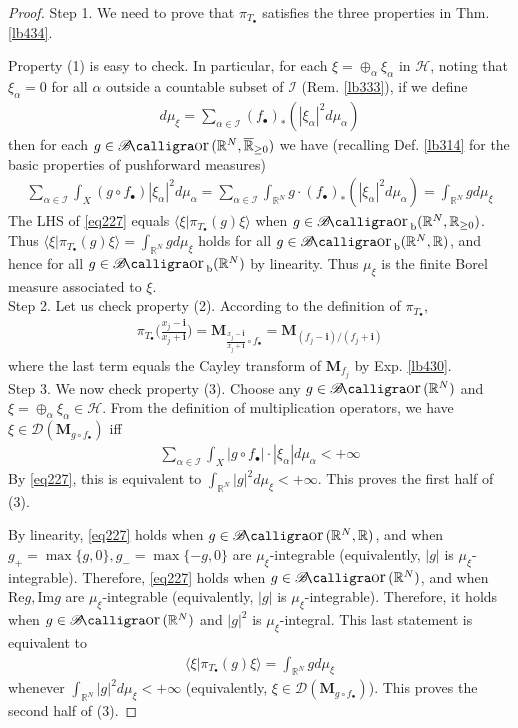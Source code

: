 \documentclass[12pt,b5paper,notitlepage]{article}
\theoremstyle{definition}
\theoremstyle{plain}
\DeclareMathOperator{\Bor}{\mathscr{B}\text{\kern -2pt {\calligra\large or}}\,}
\DeclareMathOperator{\Borb}{{\mathscr{B}\text{\kern -2pt {\calligra\large or}}\,}_{\mathrm b}}
\newcommand{\ovl}{\overline}
\newcommand{\Dom}{\mathscr{D}}
\newcommand{\bk}[1]{\langle {#1}\rangle}
\newcommand{\im}{\mathbf{i}}
\newcommand{\blt}{\bullet}
\newcommand{\Rbb}{\mathbb R}
\newcommand{\Real}{\mathrm{Re}}
\newcommand{\Imag}{\mathrm{Im}}
\newcommand{\MH}{\mathcal H}
\newcommand{\SI}{\mathscr I}
\newcommand{\Mbf}{\mathbf M}
\numberwithin{equation}{section}
\begin{document}
\begin{proof}
Step 1. We need to prove that $\pi_{T_\blt}$ satisfies the three properties in Thm. \ref{lb434}.

Property (1) is easy to check. In particular, for each $\xi=\oplus_\alpha\xi_\alpha$ in $\MH$, noting that $\xi_\alpha=0$ for all $\alpha$ outside a countable subset of $\SI$ (Rem. \ref{lb333}), if we define
\begin{align}
d\mu_\xi=\sum_{\alpha\in\SI}(f_\blt)_*(|\xi_\alpha|^2d\mu_\alpha)
\end{align}
then for each $g\in\Bor(\Rbb^N,\ovl{\Rbb}_{\geq0})$ we have (recalling Def. \ref{lb314} for the basic properties of pushforward measures)
\begin{align}\label{eq227}
\sum_{\alpha\in\SI}\int_X(g\circ f_\blt)|\xi_\alpha|^2d\mu_\alpha=\sum_{\alpha\in\SI}\int_{\Rbb^N}g\cdot (f_\blt)_*(|\xi_\alpha|^2d\mu_\alpha)=\int_{\Rbb^N}gd\mu_\xi
\end{align}
The LHS of \eqref{eq227} equals $\bk{\xi|\pi_{T_\blt}(g)\xi}$ when $g\in\Borb(\Rbb^N,\Rbb_{\geq0})$. Thus $\bk{\xi|\pi_{T_\blt}(g)\xi}=\int_{\Rbb^N}gd\mu_\xi$ holds for all $g\in\Borb(\Rbb^N,\Rbb)$, and hence for all $g\in\Borb(\Rbb^N)$ by linearity. Thus $\mu_\xi$ is the finite Borel measure associated to $\xi$.\\[-1ex]

Step 2. Let us check property (2). According to the definition of $\pi_{T_\blt}$,
\begin{align*}
\pi_{T_\blt}\Big(\frac{x_j-\im}{x_j+\im}\Big)=\Mbf_{\frac{x_j-\im}{x_j+\im}\circ f_\blt}=\Mbf_{(f_j-\im)/(f_j+\im)}
\end{align*}
where the last term equals the Cayley transform of $\Mbf_{f_j}$ by Exp. \ref{lb430}.\\[-1ex]

Step 3. We now check property (3). Choose any $g\in\Bor(\Rbb^N)$ and $\xi=\oplus_\alpha\xi_\alpha\in\MH$. From the definition of multiplication operators, we have $\xi\in\Dom(\Mbf_{g\circ f_\blt})$ iff
\begin{align*}
\sum_{\alpha\in\SI}\int_X |g\circ f_\blt|\cdot|\xi_\alpha|d\mu_\alpha<+\infty
\end{align*}
By \eqref{eq227}, this is equivalent to $\int_{\Rbb^N}|g|^2d\mu_\xi<+\infty$. This proves the first half of (3).

By linearity, \eqref{eq227} holds when $g\in\Bor(\Rbb^N,\Rbb)$, and when $g_+=\max\{g,0\},g_-=\max\{-g,0\}$ are $\mu_\xi$-integrable (equivalently, $|g|$ is $\mu_\xi$-integrable). Therefore, \eqref{eq227} holds when $g\in\Bor(\Rbb^N)$, and when $\Real g,\Imag g$ are $\mu_\xi$-integrable (equivalently, $|g|$ is $\mu_\xi$-integrable). Therefore, it holds when $g\in\Bor(\Rbb^N)$ and $|g|^2$ is $\mu_\xi$-integral. This last statement is equivalent to
\begin{align*}
\bk{\xi|\pi_{T_\blt}(g)\xi}=\int_{\Rbb^N}gd\mu_\xi
\end{align*}
whenever $\int_{\Rbb^N}|g|^2d\mu_\xi<+\infty$ (equivalently, $\xi\in\Dom(\Mbf_{g\circ f_\blt})$). This proves the second half of (3).
\end{proof}
\end{document}
